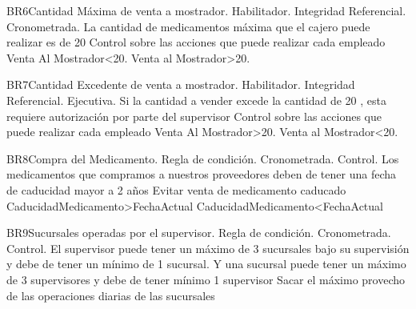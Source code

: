 \begin{BussinesRule}{BR6}{Cantidad Máxima de venta a mostrador.}
	\BRitem[Tipo:] Habilitador. 
	\BRitem[Clase:] Integridad Referencial. 
	\BRitem[Nivel:] Cronometrada. %
	\BRitem[Descripción:] La cantidad de medicamentos máxima que el cajero puede realizar es de 20
	\BRitem[Motivación:]  Control sobre las acciones que puede realizar cada empleado
	   Venta Al Mostrador<20.
	 Venta al Mostrador>20.
\end{BussinesRule}
\begin{BussinesRule}{BR7}{Cantidad Excedente de venta a mostrador.}
	\BRitem[Tipo:] Habilitador. 
	\BRitem[Clase:] Integridad Referencial. 
	\BRitem[Nivel:] Ejecutiva. %
	\BRitem[Descripción:] Si la cantidad a vender excede la cantidad de 20 , esta requiere autorización por parte del supervisor
	\BRitem[Motivación:]  Control sobre las acciones que puede realizar cada empleado
	   Venta Al Mostrador>20.
	 Venta al Mostrador<20.
\end{BussinesRule}
\begin{BussinesRule}{BR8}{Compra del Medicamento.}
	\BRitem[Tipo:] Regla de condición. 
	\BRitem[Clase:] Cronometrada. 
	\BRitem[Nivel:] Control. %
	\BRitem[Descripción:] Los medicamentos que compramos  a nuestros proveedores deben de tener una fecha de caducidad mayor a 2 años
	\BRitem[Motivación:] Evitar venta de medicamento caducado
	 CaducidadMedicamento>FechaActual
	  CaducidadMedicamento<FechaActual
\end{BussinesRule}
\begin{BussinesRule}{BR9}{Sucursales operadas por el supervisor.}
	\BRitem[Tipo:] Regla de condición. 
	\BRitem[Clase:] Cronometrada. 
	\BRitem[Nivel:] Control. %
	\BRitem[Descripción:] El supervisor puede tener un máximo de 3 sucursales bajo su supervisión y debe de tener un mínimo de 1 sucursal.  Y una sucursal puede tener un máximo de 3 supervisores y debe de tener mínimo 1 supervisor
	\BRitem[Motivación:] Sacar el máximo provecho de las operaciones diarias de las sucursales 
\end{BussinesRule}
